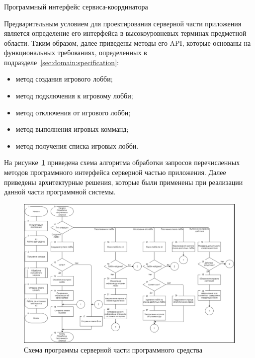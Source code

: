 \subsubsection{} Программный интерфейс сервиса-координатора
\label{sec:design:server:interface}

Предварительным условием для проектирования серверной части приложения является определение его интерфейса в высокоуровневых терминах предметной области. 
Таким образом, далее приведены методы его API, которые основаны на функциональных требованиях, определенных в подразделе~\ref{sec:domain:specification}:

\begin{itemize}
    \item метод создания игрового лобби;
    \item метод подключения к игровому лобби;
    \item метод отключения от игрового лобби;
    \item метод выполнения игровых комманд;
    \item метод получения списка игровых лобби.
\end{itemize}

На рисунке~\ref{fig:design:server:interface:service_alg} приведена схема алгоритма обработки запросов перечисленных методов программного интерфейса серверной частью приложения. 
Далее приведены архитектурные решения, которые были применены при реализации данной части программной системы. 

\begin{figure}
\centering
	\includegraphics[scale=0.7]{attachments/service_alg.png}
	\caption{Схема программы серверной части программного средства}
	\label{fig:design:server:interface:service_alg}
\end{figure}


